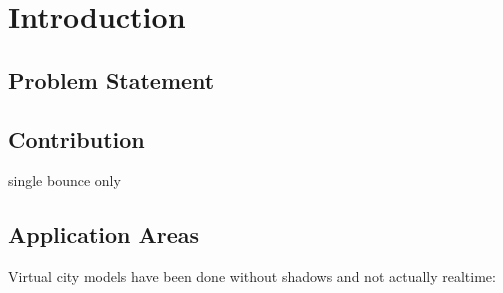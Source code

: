
\chapter{Introduction}
\label{chap:introduction}


\section{Problem Statement}



\section{Contribution}

single bounce only



\section{Application Areas}

Virtual city models have been done without shadows and not actually realtime: \citep{Klehm:2010:MassiveLightingCityModels}


\cleardoublepage
